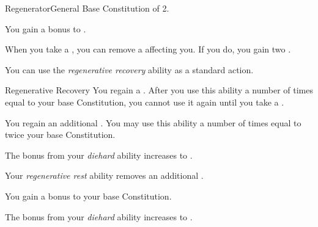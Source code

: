     \begin{feat}{Regenerator}{General}
        \featpre Base Constitution of 2.

         You gain a  bonus to .

         When you take a , you can remove a  affecting you.
        If you do, you gain two .

         You can use the \textit{regenerative recovery} ability as a standard action.
        \begin{freeability}{Regenerative Recovery}
            You regain a .
            After you use this ability a number of times equal to your base Constitution, you cannot use it again until you take a .

            \rankline
             You regain an additional .
             You may use this ability a number of times equal to twice your base Constitution.
        \end{freeability}

         The bonus from your \textit{diehard} ability increases to .

         Your \textit{regenerative rest} ability removes an additional .

         You gain a  bonus to your base Constitution.

         The bonus from your \textit{diehard} ability increases to .
    \end{feat}

